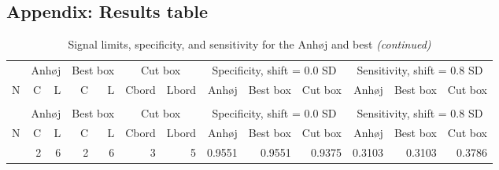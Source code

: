 

\newpage

\hypertarget{appendix-results-table}{%
\subsection{Appendix: Results table}\label{appendix-results-table}}

\begin{Schunk}

\begin{longtable}{rrrrrrrrrrrrr}
\caption{\label{tab:tab1}Signal limits, specificity, and sensitivity for the Anhøj and best box
        rules and borders for the cut box rules. N = number of data points in
        chart.
        C = lower limit for number of crossings, L = upper limit for longest 
        run,  for declaring random variation by the Anhøj and best box rules. 
        Cbord and Lbord = Additional information for the cut box rules. When
        specified, parts of the border of the best box to retain to declare
        random variation. When not specified, cut box is identical to best box.}\\
\toprule
\multicolumn{1}{c}{ } & \multicolumn{2}{c}{Anhøj} & \multicolumn{2}{c}{Best box} & \multicolumn{2}{c}{Cut box} & \multicolumn{3}{c}{Specificity, shift = 0.0 SD} & \multicolumn{3}{c}{Sensitivity, shift = 0.8 SD} \\
\cmidrule(l{3pt}r{3pt}){2-3} \cmidrule(l{3pt}r{3pt}){4-5} \cmidrule(l{3pt}r{3pt}){6-7} \cmidrule(l{3pt}r{3pt}){8-10} \cmidrule(l{3pt}r{3pt}){11-13}
N & C & L & C & L & Cbord & Lbord & Anhøj & Best box & Cut box & Anhøj & Best box & Cut box\\
\midrule
\endfirsthead
\caption[]{Signal limits, specificity, and sensitivity for the Anhøj and best  \textit{(continued)}}\\
\toprule
\multicolumn{1}{c}{ } & \multicolumn{2}{c}{Anhøj} & \multicolumn{2}{c}{Best box} & \multicolumn{2}{c}{Cut box} & \multicolumn{3}{c}{Specificity, shift = 0.0 SD} & \multicolumn{3}{c}{Sensitivity, shift = 0.8 SD} \\
\cmidrule(l{3pt}r{3pt}){2-3} \cmidrule(l{3pt}r{3pt}){4-5} \cmidrule(l{3pt}r{3pt}){6-7} \cmidrule(l{3pt}r{3pt}){8-10} \cmidrule(l{3pt}r{3pt}){11-13}
N & C & L & C & L & Cbord & Lbord & Anhøj & Best box & Cut box & Anhøj & Best box & Cut box\\
\midrule
\endhead
\
\endfoot
\bottomrule
\endlastfoot
10 & 2 & 6 & 2 & 6 & 3 & 5 & 0.9551 & 0.9551 & 0.9375 & 0.3103 & 0.3103 & 0.3786\\

\end{longtable}
\end{Schunk}
